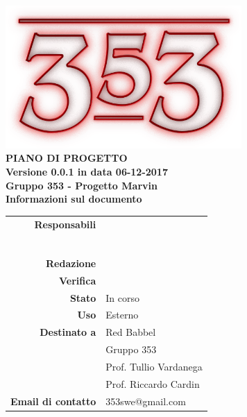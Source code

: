 \documentclass[openany, a4paper, 12pt]{report}
\begin{document}
\begin{titlepage}
	\centering
	\vfill
	{
		\bfseries
		\vskip2cm
		\includegraphics[width=9cm]{../../common/images/logo.png} \\
		\vfill
		\Huge{PIANO DI PROGETTO}\\
		\vfill
		\Large Versione 0.0.1 in data 06-12-2017\\
		\large Gruppo 353 - Progetto Marvin\\
		\vfill
		\normalsize Informazioni sul documento\\
		\begin{table}[htbp]
			\centering
			\renewcommand\arraystretch{1.2}
			\begin{tabular}{r|l}
				\hline
				\textbf{Responsabili}	& \Elena\\
										& \Valentina\\
										& \Mirco\\
										& \Riccardo\\
										& \Gianluca\\
										& \Parwinder\\
										& \Davide\\
				\textbf{Redazione} 		& \\
				\textbf{Verifica} 		& \\	
				
				\textbf{Stato} 			& In corso\\
				\textbf{Uso}			& Esterno\\
				\textbf{Destinato a}   	& Red Babbel\\
										& Gruppo 353\\
										& Prof. Tullio Vardanega\\
										& Prof. Riccardo Cardin\\
				
				\textbf{Email di contatto}	& 353swe@gmail.com
			\end{tabular}
		\end{table}
		\vfill
	}    
\end{titlepage}

\tableofcontents
\listoffigures
\newpage
{}






 
\end{document}
